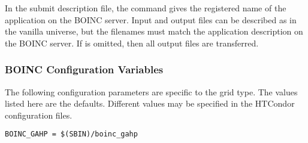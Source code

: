 In the submit description file, the  command
gives the registered name of the application on the BOINC server.
Input and output files can be described as in the vanilla universe,
but the filenames must match the application description on the
BOINC server.
If  is omitted, then all output
files are transferred.

\subsubsection{\label{sec:Boinc-config}BOINC Configuration Variables}

The following configuration parameters are specific to the 
grid type. 
The values listed here are the defaults. 
Different values may be specified in the HTCondor configuration files.

\footnotesize
\begin{verbatim}
BOINC_GAHP = $(SBIN)/boinc_gahp
\end{verbatim}
\normalsize

